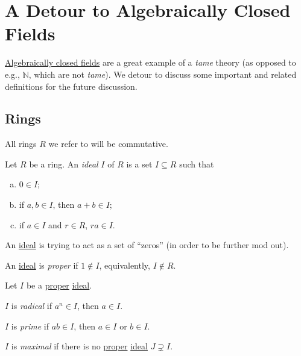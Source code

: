 \section{A Detour to Algebraically Closed Fields}
\hyperref[def:algebraically-closed]{Algebraically closed fields} are a great example of a \emph{tame} theory (as opposed to e.g., \(\mathbb{N} \), which are not \emph{tame}). We detour to discuss some important and related definitions for the future discussion.

\subsection{Rings}
All rings \(R\) we refer to will be commutative.

\begin{definition}[Ideal]\label{def:ideal}
	Let \(R\) be a ring. An \emph{ideal} \(I\) of \(R\) is a set \(I \subseteq R\) such that
	\begin{enumerate}[(a)]
		\item \(0\in I\);
		\item if \(a, b\in I\), then \(a+b\in I\);
		\item if \(a\in I\) and \(r\in R\), \(ra\in I\).
	\end{enumerate}
\end{definition}

\begin{intuition}
	An \hyperref[def:ideal]{ideal} is trying to act as a set of ``zeros'' (in order to be further mod out).
\end{intuition}

\begin{definition}[Proper]\label{def:proper}
	An \hyperref[def:ideal]{ideal} is \emph{proper} if \(1 \notin I\), equivalently, \(I \notin R\).
\end{definition}

\begin{definition*}
	Let \(I\) be a \hyperref[def:proper]{proper} \hyperref[def:ideal]{ideal}.

	\begin{definition}[Radical]\label{def:radical}
		\(I\) is \emph{radical}	if \(a^n\in I\), then \(a\in I\).
	\end{definition}

	\begin{definition}[Prime]\label{def:prime}
		\(I\) is \emph{prime} if \(ab\in I\), then \(a\in I\) or \(b\in I\).
	\end{definition}

	\begin{definition}[Maximal]\label{def:proper-ideal-maximal}
		\(I\) is \emph{maximal} if there is no \hyperref[def:proper]{proper} \hyperref[def:ideal]{ideal} \(J \supsetneq I \).
	\end{definition}
\end{definition*}

